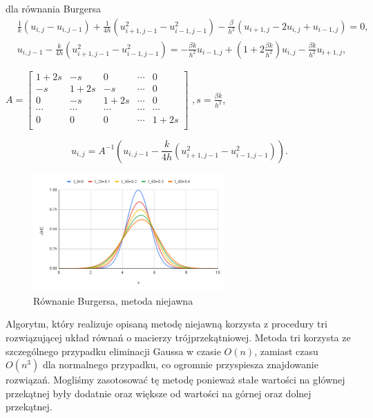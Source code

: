 \documentclass[12pt, a4paper]{article}
\begin{document}
dla równania Burgersa
\begin{equation}
\begin{split}
& \frac{1}{k}(u_{i,j}-u_{i,j-1})+\frac{1}{4h}(u_{i+1,j-1}^{2}-u_{i-1,j-1}^{2})-\frac{\beta}{h^{2}}(u_{i+1,j}-2u_{i,j}+u_{i-1,j})=0,\\
& u_{i,j-1}-\frac{k}{4h}(u_{i+1,j-1}^{2}-u_{i-1,j-1}^{2})=-\frac{\beta k}{h^{2}}u_{i-1,j}+(1+2\frac{\beta k}{h^{2}})u_{i,j}-\frac{\beta k}{h^{2}}u_{i+1,j},
\end{split}
\end{equation}
\begin{center}
$A=
\begin{bmatrix}
1+2s & -s & 0 & \cdots & 0\\
-s & 1+2s & -s & \cdots & 0\\
0 & -s & 1+2s & \cdots & 0\\
\cdots & \cdots & \cdots & \cdots & \cdots\\
0 & 0 & 0 & \cdots & 1+2s\\
\end{bmatrix}$
$,s=\frac{\beta k}{h^{2}}$,
\end{center}
\begin{equation}
u_{i,j}=A^{-1}(u_{i,j-1}-\frac{k}{4h}(u_{i+1,j-1}^{2}-u_{i-1,j-1}^{2})).
\end{equation}
\begin{figure}[h]
\caption{Równanie Burgersa, metoda niejawna}
\centering
\includegraphics[width=0.65\textwidth]{9}
\end{figure}
\newline
Algorytm, który realizuje opisaną metodę niejawną korzysta z procedury tri rozwiązującej układ równań o macierzy trójprzekątniowej. Metoda tri korzysta ze szczególnego przypadku eliminacji Gaussa w czasie $O(n)$, zamiast czasu $O(n^3)$ dla normalnego przypadku, co ogromnie przyspiesza znajdowanie rozwiązań. Mogliśmy zasotosować tę metodę ponieważ stałe wartości na głównej przekątnej były dodatnie oraz większe od wartości na górnej oraz dolnej przekątnej. 
\newpage
\end{document}
